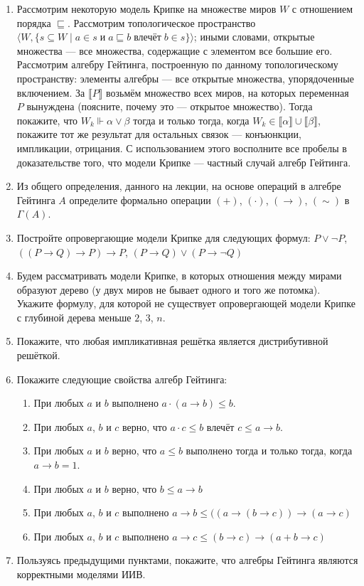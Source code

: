 \documentclass[10pt,a4paper,oneside]{article}
\begin{document}
\begin{enumerate}
\item Рассмотрим некоторую модель Крипке на множестве миров $W$ с отношением
порядка $\sqsubseteq$. Рассмотрим топологическое пространство
$\langle W, \{s\subseteq W \mid a \in s \;\textrm{и}\; a \sqsubseteq b \;\textrm{влечёт}\; b \in s\}\rangle$;
иными словами, открытые множества --- все множества, содержащие с элементом все большие его.
Рассмотрим алгебру Гейтинга, построенную по данному топологическому пространству:
элементы алгебры --- все открытые множества, упорядоченные включением.
За $\llbracket P \rrbracket$ возьмём множество всех миров, на которых переменная $P$ вынуждена
(поясните, почему это --- открытое множество).
Тогда покажите, что $W_k \Vdash \alpha \vee \beta$ тогда и только тогда, когда
$W_k \in \llbracket \alpha \rrbracket \cup \llbracket \beta \rrbracket$, покажите тот же
результат для остальных связок --- конъюнкции, импликации, отрицания.
С использованием этого восполните все пробелы в доказательстве 
того, что модели Крипке --- частный случай алгебр Гейтинга.
\item Из общего определения, данного на лекции, на основе операций в алгебре Гейтинга $A$ 
определите формально операции $(+)$, $(\cdot)$, $(\rightarrow)$, $(\sim)$ в $\Gamma(A)$.
\item Постройте опровергающие модели Крипке для следующих формул:
$P\vee\neg P$, $((P\rightarrow Q)\rightarrow P)\rightarrow P$, 
$(P\rightarrow Q)\vee(P\rightarrow\neg Q)$
\item Будем рассматривать модели Крипке, в которых отношения между мирами образуют дерево
(у двух миров не бывает одного и того же потомка). Укажите формулу, для которой не 
существует опровергающей модели Крипке с глубиной дерева меньше $2$, $3$, $n$.
\item Покажите, что любая импликативная решётка является дистрибутивной решёткой.
\item Покажите следующие свойства алгебр Гейтинга:
\begin{enumerate}
\item При любых $a$ и $b$ выполнено $a\cdot (a\rightarrow b) \le b$.
\item При любых $a$, $b$ и $c$ верно, что $a\cdot c \le b$ влечёт $c \le a \rightarrow b$.
\item При любых $a$ и $b$ верно, что $a \le b$ выполнено тогда и только тогда, когда $a \rightarrow b = 1$.
\item При любых $a$ и $b$ верно, что $b \le a \rightarrow b$
\item При любых $a$, $b$ и $c$ выполнено $a\rightarrow b \le ((a\rightarrow (b \rightarrow c)) \rightarrow (a\rightarrow c)$
\item При любых $a$, $b$ и $c$ выполнено $a\rightarrow c \le (b\rightarrow c) \rightarrow (a+b \rightarrow c)$
\end{enumerate}
\item Пользуясь предыдущими пунктами, покажите, что алгебры Гейтинга являются 
корректными моделями ИИВ.
\end{enumerate}
\end{document}
